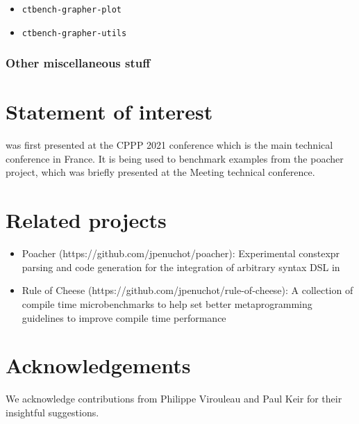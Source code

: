 \documentclass[../../main.tex]{subfiles}
\begin{document}
\begin{itemize}
\item \lstinline{ctbench-grapher-plot} %
\item \lstinline{ctbench-grapher-utils} %
\end{itemize}

\subsubsection{Other miscellaneous stuff}


\section{Statement of interest} %

\ctbench was first presented at the CPPP 2021 conference\cite{ctbench-cppp21}
which is the main \cpp technical conference in France. It is being used to
benchmark examples from the poacher\cite{poacher} project, which was briefly
presented at the Meeting \cite{meetingcpp22} technical conference.

\section{Related projects} %

\begin{itemize}

\item Poacher (https://github.com/jpenuchot/poacher): Experimental constexpr
      parsing and code generation for the integration of arbitrary syntax DSL in

\item Rule of Cheese (https://github.com/jpenuchot/rule-of-cheese):
      A collection of compile time microbenchmarks to help set better
      \cpp metaprogramming guidelines to improve compile time performance
\end{itemize}

\section{Acknowledgements}

We acknowledge contributions from Philippe Virouleau and Paul Keir for their
insightful suggestions.
\end{document}
